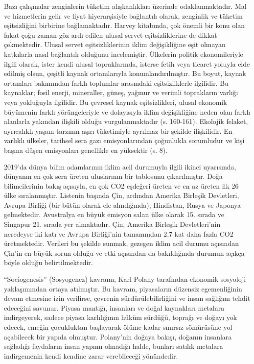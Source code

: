 \documentclass[
]{book}
\begin{document}
Bazı çalışmalar zenginlerin tüketim alışkanlıkları üzerinde odaklanmaktadır. Mal ve hizmetlerin gelir ve fiyat hiyerarşisiyle bağlantılı olarak, zenginlik ve tüketim eşitsizliğini birbirine bağlamaktadır. Harvey kitabında, çok önemli bir konu olan fakat çoğu zaman göz ardı edilen ulusal servet eşitsizliklerine de dikkat çekmektedir. Ulusal servet eşitsizliklerinin iklim değişikliğine eşit olmayan katkılarla nasıl bağlantılı olduğunu incelemiştir. Ülkelerin politik ekonomileriyle ilgili olarak, ister kendi ulusal topraklarında, isterse fetih veya ticaret yoluyla elde edilmiş olsun, çeşitli kaynak ortamlarıyla konumlandırılmıştır. Bu boyut, kaynak ortamları bakımından farklı toplumlar arasındaki eşitsizliklerle ilgilidir. Bu kaynaklar; fosil enerji, mineraller, güneş, yağmur ve verimli toprakların varlığı veya yokluğuyla ilgilidir. Bu çevresel kaynak eşitsizlikleri, ulusal ekonomik büyümenin farklı yörüngeleriyle ve dolayısıyla iklim değişikliğine neden olan farklı alanlarla yakından ilişkili olduğu vurgulanmaktadır (s. 160-161). \citep{harvey2016climate} Ekolojik felaket, ayrıcalıklı yaşam tarzının aşırı tüketimiyle ayrılmaz bir şekilde ilişkilidir. En varlıklı ülkeler, tarihsel sera gazı emisyonlarından çoğunlukla sorumludur ve kişi başına düşen emisyonları genellikle en yüksektir (s. 8). \citep{ripple2019world}

2019'da dünya bilim adamlarının iklim acil durumuyla ilgili ikinci uyarısında, dünyanın en çok sera üreten uluslarının bir tablosunu çıkarılmıştır. Doğa bilimcilerinin bakış açısıyla, en çok CO2 eşdeğeri üreten ve en az üreten ilk 26 ülke sıralanmıştır. Listenin başında Çin, ardından Amerika Birleşik Devletleri, Avrupa Birliği (bir bütün olarak ele alındığında), Hindistan, Rusya ve Japonya gelmektedir. Avustralya en büyük emisyon salan ülke olarak 15. sırada ve Singapur 21. sırada yer almaktadır. Çin, Amerika Birleşik Devletleri'nin neredeyse iki katı ve Avrupa Birliği'nin tamamından 2,7 kat daha fazla CO2 üretmektedir. Verileri bu şekilde sunmak, gezegen iklim acil durumu açısından Çin'in en büyük sorun olduğu ve etki açısından da bakıldığında durumun açıkça böyle olduğu belirtilmektedir. \citep{ripple2019world}

``Sociogenesis'' (Sosyogenez) kavramı, Karl Polany tarafından ekonomik sosyoloji yaklaşımından ortaya atılmıştır. Bu kavram, piyasaların düzensiz egemenliğinin devam etmesine izin verilirse, çevrenin sürdürülebilirliğini ve insan sağlığını tehdit edeceğini savunur. Piyasa mantığı, insanları ve doğal kaynakları metalara indirgeyerek, sadece piyasa karlılığının hüküm sürdüğü, toprağı ve doğayı yok edecek, emeğin çocukluktan başlayarak ölüme kadar sınırsız sömürüsüne yol açabilecek bir yapıda olmuştur. Polany'nin doğaya bakışı, doğanın insanlara sağladığı faydaların insan yapımı olmadığı halde, bunları satılık metalara indirgemenin kendi kendine zarar verebileceği yönündedir. \citep{harvey2016climate}
\end{document}
